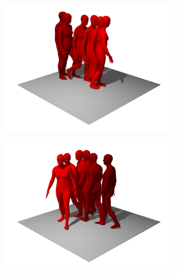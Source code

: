 \begin{figure}
    \centering
    \begin{subfigure}{0.32\linewidth}
        \includegraphics[width=\linewidth]{figures/results/single-runs1.png}
    \end{subfigure}
    \hfill
    \begin{subfigure}{0.32\linewidth}
        \includegraphics[width=\linewidth]{figures/results/single-runs2.png}
    \end{subfigure}
    \hfill
    \begin{subfigure}{0.32\linewidth}

\end{subfigure}
\end{figure}
